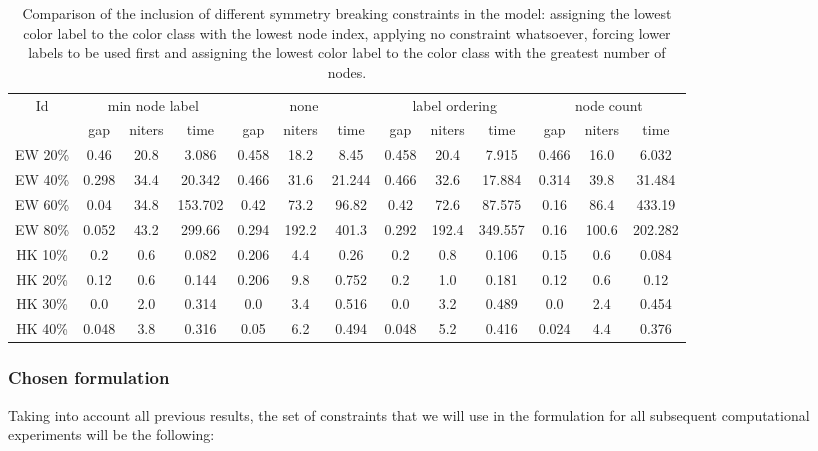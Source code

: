 \begin{sidewaystable}
\label{table:models:sym}
\centering

\begin{tabular}{|c|ccc|ccc|ccc|ccc|}
\hline
\multicolumn{1}{|c|}{Id} & \multicolumn{3}{|c|}{min node label} & \multicolumn{3}{|c|}{none} & \multicolumn{3}{|c|}{label ordering} & \multicolumn{3}{|c|}{node count}
\\
 & gap & niters & time & gap & niters & time & gap & niters & time & gap & niters & time
\\
\hline
EW 20\% & 0.46 & 20.8 & 3.086 & 0.458 & 18.2 & 8.45 & 0.458 & 20.4 & 7.915 & 0.466 & 16.0 & 6.032
\\
EW 40\% & 0.298 & 34.4 & 20.342 & 0.466 & 31.6 & 21.244 & 0.466 & 32.6 & 17.884 & 0.314 & 39.8 & 31.484
\\
EW 60\% & 0.04 & 34.8 & 153.702 & 0.42 & 73.2 & 96.82 & 0.42 & 72.6 & 87.575 & 0.16 & 86.4 & 433.19
\\
EW 80\% & 0.052 & 43.2 & 299.66 & 0.294 & 192.2 & 401.3 & 0.292 & 192.4 & 349.557 & 0.16 & 100.6 & 202.282
\\
HK 10\% &  0.2 &  0.6 & 0.082 & 0.206 &  4.4 & 0.26 &  0.2 &  0.8 & 0.106 & 0.15 &  0.6 & 0.084
\\
HK 20\% & 0.12 &  0.6 & 0.144 & 0.206 &  9.8 & 0.752 &  0.2 &  1.0 & 0.181 & 0.12 &  0.6 & 0.12
\\
HK 30\% &  0.0 &  2.0 & 0.314 &  0.0 &  3.4 & 0.516 &  0.0 &  3.2 & 0.489 &  0.0 &  2.4 & 0.454
\\
HK 40\% & 0.048 &  3.8 & 0.316 & 0.05 &  6.2 & 0.494 & 0.048 &  5.2 & 0.416 & 0.024 &  4.4 & 0.376
\\
\hline 
 \end{tabular}

\caption{Comparison of the inclusion of different symmetry breaking constraints in the model: assigning the lowest color label to the color class with the lowest node index, applying no constraint whatsoever, forcing lower labels to be used first and assigning the lowest color label to the color class with the greatest number of nodes.}

\end{sidewaystable}

\subsubsection*{Chosen formulation}
\label{subsubsec:results:model:chosen}

Taking into account all previous results, the set of constraints that we will use in the \PCP{} formulation for all subsequent computational experiments will be the following:

